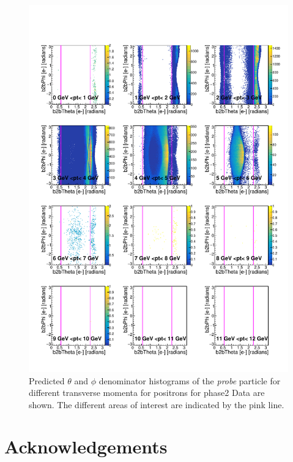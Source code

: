\documentclass[a4paper,11pt,twosided,final,german,openbib,pdftex,listof=totoc,bibliography=totoc]{scrbook}
\begin{document}
\begin{appendix}
\begin{figure}[h!]
	\includegraphics[width=\textwidth]{Plots/RTPtMepD_Data.pdf}
	\caption[Denominator $\theta$, $\phi$ Positron Transverse Momentum Data]{Predicted $\theta$ and $\phi$ denominator histograms of the \textit{probe} particle for different transverse momenta for positrons for phase2 Data are shown. The different areas of interest are indicated by the pink line.}
	\label{plt:RTtPMepD_Data}
\end{figure}


\listoffigures
\listoftables

\nocite{*}
\printbibliography[title={Bibliography}]


\chapter{Acknowledgements}


\end{appendix}
\end{document}
